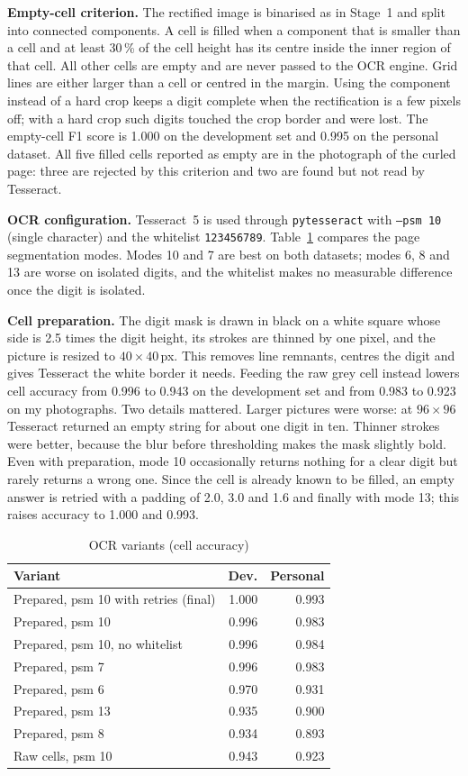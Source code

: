\documentclass[conference]{IEEEtran}
\begin{document}
\textbf{Empty-cell criterion.} The rectified image is binarised as in
Stage~1 and split into connected components. A cell is filled when a
component that is smaller than a cell and at least 30\,\% of the cell height
has its centre inside the inner region of that cell. All other cells are
empty and are never passed to the OCR engine. Grid lines are either larger
than a cell or centred in the margin. Using the component instead of a hard
crop keeps a digit complete when the rectification is a few pixels off; with
a hard crop such digits touched the crop border and were lost. The
empty-cell F1 score is 1.000 on the development set and 0.995 on the
personal dataset. All five filled cells reported as empty are in the
photograph of the curled page: three are rejected by this criterion and two
are found but not read by Tesseract.

\textbf{OCR configuration.} Tesseract~5 is used through
\texttt{pytesseract} with \texttt{--psm 10} (single character) and the
whitelist \texttt{123456789}. Table~\ref{tab:ocr} compares the page
segmentation modes. Modes 10 and 7 are best on both datasets; modes 6, 8 and
13 are worse on isolated digits, and the whitelist makes no measurable
difference once the digit is isolated.

\textbf{Cell preparation.} The digit mask is drawn in black on a white
square whose side is 2.5 times the digit height, its strokes are thinned by
one pixel, and the picture is resized to $40\times40$\,px. This removes line
remnants, centres the digit and gives Tesseract the white border it needs.
Feeding the raw grey cell instead lowers cell accuracy from 0.996 to 0.943
on the development set and from 0.983 to 0.923 on my photographs. Two
details mattered. Larger pictures were worse: at $96\times96$ Tesseract
returned an empty string for about one digit in ten. Thinner strokes were
better, because the blur before thresholding makes the mask slightly bold.
Even with preparation, mode 10 occasionally returns nothing for a clear
digit but rarely returns a wrong one. Since the cell is already known
to be filled, an empty answer is retried with a padding of 2.0, 3.0 and 1.6
and finally with mode 13; this raises accuracy to 1.000 and 0.993.

\begin{table}[t]
\caption{OCR variants (cell accuracy)}
\label{tab:ocr}
\centering
\begin{tabular}{lrr}
\toprule
Variant & Dev. & Personal\\
\midrule
Prepared, psm 10 with retries (final) & 1.000 & 0.993\\
Prepared, psm 10 & 0.996 & 0.983\\
Prepared, psm 10, no whitelist & 0.996 & 0.984\\
Prepared, psm 7 & 0.996 & 0.983\\
Prepared, psm 6 & 0.970 & 0.931\\
Prepared, psm 13 & 0.935 & 0.900\\
Prepared, psm 8 & 0.934 & 0.893\\
Raw cells, psm 10 & 0.943 & 0.923\\
\bottomrule
\end{tabular}
\end{table}
\end{document}
